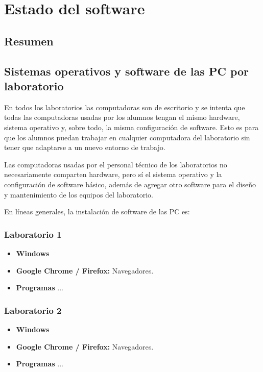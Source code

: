 \chapter[Estado del software]{Estado del software}
\label{cp:Estado-software}

\section*{Resumen}

\section{Sistemas operativos y software de las PC por laboratorio}
En todos los laboratorios las computadoras son de escritorio y se intenta que todas las computadoras usadas por los alumnos tengan el mismo hardware, sistema operativo y, sobre todo, la misma configuración de software. Esto es para que los alumnos puedan trabajar en cualquier computadora del laboratorio sin tener que adaptarse a un nuevo entorno de trabajo. 

Las computadoras usadas por el personal técnico de los laboratorios no necesariamente comparten hardware, pero sí el sistema operativo y la configuración de software básico, además de agregar otro software para el diseño y mantenimiento de los equipos del laboratorio. 

En líneas generales, la instalación de software de las PC es:
\subsection{Laboratorio 1}
\begin{itemize}
    \item \textbf{Windows }
    \item \textbf{Google Chrome / Firefox:} Navegadores.
    \item \textbf{Programas }...
\end{itemize}

\subsection{Laboratorio 2}
\begin{itemize}
    \item \textbf{Windows }
    \item \textbf{Google Chrome / Firefox:} Navegadores.
    \item \textbf{Programas }...
\end{itemize}


